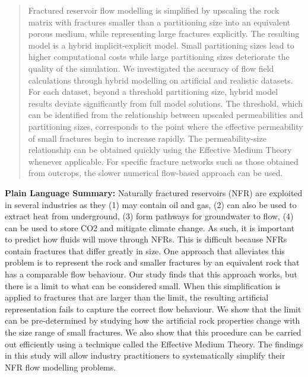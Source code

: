 \documentclass[draft]{agujournal2018}
\begin{document}
\begin{abstract}
Fractured reservoir flow modelling is simplified by upscaling the rock matrix with fractures smaller than a partitioning size into an equivalent porous medium, while representing large fractures explicitly. The resulting model is a hybrid implicit-explicit model. Small partitioning sizes lead to higher computational costs while large partitioning sizes deteriorate the quality of the simulation. We investigated the accuracy of flow field calculations through hybrid modelling on artificial and realistic datasets. For each dataset, beyond a threshold partitioning size, hybrid model results deviate significantly from full model solutions. The threshold, which can be identified from the relationship between upscaled permeabilities and partitioning sizes, corresponds to the point where the effective permeability of small fractures begin to increase rapidly. The permeability-size relationship can be obtained quickly using the Effective Medium Theory whenever applicable. For specific fracture networks such as those obtained from outcrops, the slower numerical flow-based approach can be used.

\end{abstract}

\textbf{Plain Language Summary:} Naturally fractured reservoirs (NFR) are exploited in several industries as they (1) may contain oil and gas, (2) can also be used to extract heat from underground, (3) form pathways for groundwater to flow, (4) can be used to store CO2 and mitigate climate change. As such, it is important to predict how fluids will move through NFRs. This is difficult because NFRs contain fractures that differ greatly in size. One approach that alleviates this problem is to represent the rock and smaller fractures by an equivalent rock that has a comparable flow behaviour. Our study finds that this approach works, but there is a limit to what can be considered small. When this simplification is applied to fractures that are larger than the limit, the resulting artificial representation fails to capture the correct flow behaviour. We show that the limit can be pre-determined by studying how the artificial rock properties change with the size range of small fractures. We also show that this procedure can be carried out efficiently using a technique called the Effective Medium Theory. The findings in this study will allow industry practitioners to systematically simplify their NFR flow modelling problems.
\end{document}
